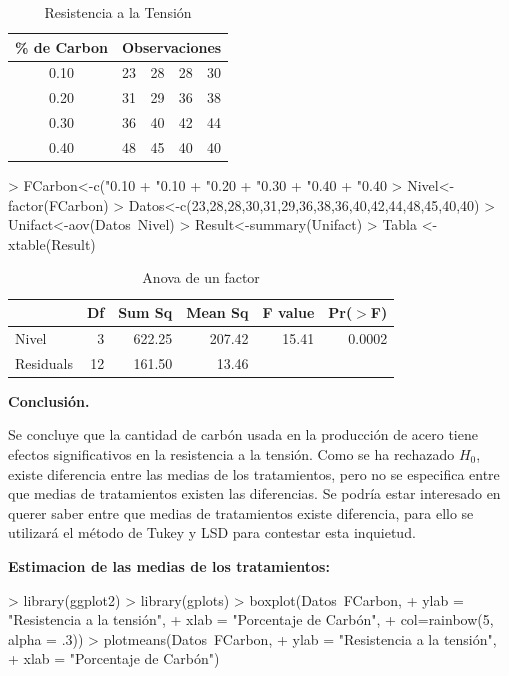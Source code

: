 \documentclass[12pt,letterpaper]{report}
\begin{document}
\begin{table}[htb]
\centering
\begin{tabular}{||c|c|c|c|c||}
\hline
\hline
\% de Carbon  & \multicolumn{4}{c||}{Observaciones} \\
\hline
0.10 &23&28&28&30 \\
\hline
0.20 &31&29&36&38 \\
\hline
0.30 &36&40&42&44 \\
\hline
0.40 &48&45&40&40 \\
\hline
\hline

\end{tabular}
\caption{Resistencia a la Tensión}
\end{table}

\begin{Schunk}
\begin{Sinput}
> FCarbon<-c("0.10%
+            "0.10%
+            "0.20%
+            "0.30%
+            "0.40%
+            "0.40%
> Nivel<-factor(FCarbon)
> Datos<-c(23,28,28,30,31,29,36,38,36,40,42,44,48,45,40,40)
> Unifact<-aov(Datos~Nivel)
> Result<-summary(Unifact)
> Tabla <- xtable(Result)
\end{Sinput}
\end{Schunk}

\begin{table}[ht]
\centering
\begin{tabular}{lrrrrr}
  \hline
 & Df & Sum Sq & Mean Sq & F value & Pr($>$F) \\ 
  \hline
Nivel       & 3 & 622.25 & 207.42 & 15.41 & 0.0002 \\ 
  Residuals   & 12 & 161.50 & 13.46 &  &  \\ 
   \hline
\end{tabular}
\caption{Anova de un factor}
\end{table}

\textbf{Conclusión.}

Se concluye que la cantidad de carbón usada en la producción de acero tiene efectos
significativos en la resistencia a la tensión.
Como se ha rechazado $H_0$, existe diferencia entre las medias de los tratamientos, pero no
se especifica entre que medias de tratamientos existen las diferencias.
Se podría estar interesado en querer saber entre que medias de tratamientos existe
diferencia, para ello se utilizará el método de Tukey y LSD para contestar esta inquietud.

\textbf{Estimacion de las medias de los tratamientos:}
\begin{Schunk}
\begin{Sinput}
> library(ggplot2)
> library(gplots)
> boxplot(Datos~FCarbon,
+         ylab = "Resistencia a la tensión",
+         xlab = "Porcentaje de Carbón",
+         col=rainbow(5, alpha = .3))
> plotmeans(Datos~FCarbon,
+           ylab = "Resistencia a la tensión",
+           xlab = "Porcentaje de Carbón")
\end{Sinput}
\end{Schunk}
\end{document}
